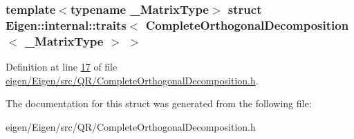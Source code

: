 \subsubsection*{template$<$typename \+\_\+\+Matrix\+Type$>$\newline
struct Eigen\+::internal\+::traits$<$ Complete\+Orthogonal\+Decomposition$<$ \+\_\+\+Matrix\+Type $>$ $>$}



Definition at line \hyperlink{eigen_2_eigen_2src_2_q_r_2_complete_orthogonal_decomposition_8h_source_l00017}{17} of file \hyperlink{eigen_2_eigen_2src_2_q_r_2_complete_orthogonal_decomposition_8h_source}{eigen/\+Eigen/src/\+Q\+R/\+Complete\+Orthogonal\+Decomposition.\+h}.



The documentation for this struct was generated from the following file\+:\begin{DoxyCompactItemize}
\item 
eigen/\+Eigen/src/\+Q\+R/\+Complete\+Orthogonal\+Decomposition.\+h\end{DoxyCompactItemize}
